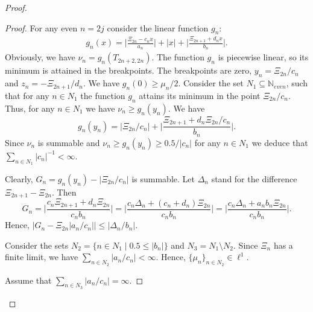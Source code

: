 \begin{proof}
\begin{proof}
        For any even $n = 2j$ consider the linear function $g_n$:
        \begin{align*}
          g_{n}(x) = \Big\lvert \frac{\Xi_{2n} - c_{n} x}{a_{n}} \Big\rvert +
                       \lvert x \rvert +
                     \Big\lvert \frac{\Xi_{2n+1} + d_{n} x}{b_{n}} \Big\rvert.
        \end{align*}
        Obviously, we have $\nu_{n} = g_{n}(T_{2n+2, 2n})$.
        The function $g_n$ is piecewise linear, so its minimum is attained in the breakpoints.
        The breakpoints are zero, $y_n = \Xi_{2n}/c_n$ and $z_n = -\Xi_{2n+1}/d_n$.
        We have $g_n(0) \geq \mu_n/2$.
        Consider the set $N_1 \subseteq \mathbb{N}_{{even}}$, such that for any $n \in N_1$ the function $g_n$ attains its minimum in
          the point $\Xi_{2n}/c_n$.
        Thus, for any $n\in N_1$ we have $\nu_n \geq g_n(y_n)$.
        We have
        \[
          g_n(y_n) = \Big\lvert \Xi_{2n}/c_n \Big\rvert +
                   \Big\lvert \frac{\Xi_{2n+1} + d_{n} \Xi_{2n}/c_n}{b_{n}} \Big\rvert.
        \]
        Since $\nu_n$ is summable and $\nu_n \geq g_n(y_n) \geq 0.5/|c_n|$ for any $n \in N_1$
          we deduce that $\sum_{n \in N_1} |c_n|^{-1} < \infty$.

        Clearly, $G_n = g_n(y_n) - \Big\lvert \Xi_{2n}/c_n \Big\rvert$ is summable.
        Let $\Delta_n$ stand for the difference $\Xi_{2n+1} - \Xi_{2n}$.
        Then
        \[
          G_n = \Big\lvert \frac{c_n \Xi_{2n+1} + d_{n} \Xi_{2n}}{c_n b_n} \Big\rvert
              = \Big\lvert \frac{c_n \Delta_n + (c_n + d_n) \Xi_{2n}}{c_n b_n} \Big\rvert
              = \Big\lvert \frac{c_n \Delta_n + a_n b_n\Xi_{2n}}{c_n b_n} \Big\rvert.
        \]
        Hence, $\big\lvert G_n - \Xi_{2n}\lvert a_n/c_n\rvert \big\rvert \leq \lvert \Delta_n/b_n \rvert$.

        Consider the sets $N_2 = \{n\in N_1 \mid 0.5 \leq \lvert b_n \rvert\}$ and $N_3 = N_1 \setminus N_2$.
        Since $\Xi_n$ has a finite limit, we have $\sum_{n \in N_2} \lvert a_n/c_n \rvert < \infty$.
        Hence, $\{\mu_n\}_{n \in N_2} \in \ell^1$.

        Assume that $\sum_{n \in N_3} \lvert a_n/c_n\rvert = \infty$.


\end{proof}
\end{proof}
